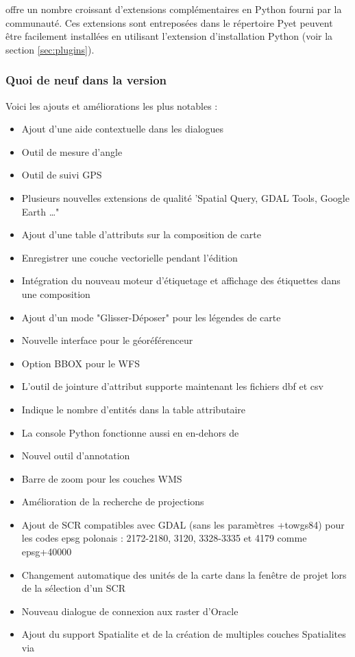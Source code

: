 
\qg offre un nombre croissant d'extensions complémentaires en Python fourni par la communauté. Ces extensions sont entreposées dans le répertoire Py\qg et peuvent être facilement installées en utilisant l'extension d'installation Python (voir la section \ref{sec:plugins}).

\subsubsection{Quoi de neuf dans la version ~\CURRENT} 

Voici les ajouts et améliorations les plus notables :
\begin{itemize}[label=--]
 \item Ajout d'une aide contextuelle dans les dialogues
 \item Outil de mesure d'angle
 \item Outil de suivi GPS
 \item Plusieurs nouvelles extensions de qualité 'Spatial Query, GDAL Tools, Google Earth \dots"
 \item Ajout d'une table d'attributs sur la composition de carte
 \item Enregistrer une couche vectorielle pendant l'édition
 \item Intégration du nouveau moteur d'étiquetage et affichage des étiquettes dans une composition
 \item Ajout d'un mode "Glisser-Déposer" pour les légendes de carte
 \item Nouvelle interface pour le géoréférenceur
 \item Option BBOX pour le WFS 
 \item L'outil de jointure d'attribut supporte maintenant les fichiers dbf et csv
 \item Indique le nombre d'entités dans la table attributaire
 \item La console Python fonctionne aussi en en-dehors de \qg
 \item Nouvel outil d'annotation
 \item Barre de zoom pour les couches WMS
 \item Amélioration de la recherche de projections
 \item Ajout de SCR compatibles avec GDAL (sans les paramètres +towgs84) pour les codes epsg polonais : 2172-2180, 3120, 3328-3335 et 4179 comme epsg+40000
 \item Changement automatique des unités de la carte dans la fenêtre de projet lors de la sélection d'un SCR
 \item Nouveau dialogue de connexion aux raster d'Oracle
 \item Ajout du support Spatialite et de la création de multiples couches Spatialites via \qg
\end{itemize}
